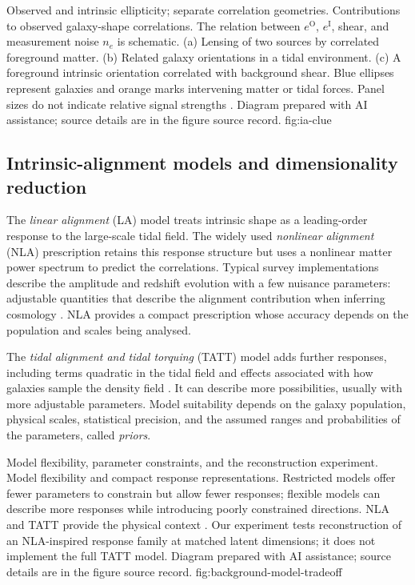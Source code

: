   {Observed and intrinsic ellipticity; separate correlation geometries.}
  {Contributions to observed galaxy-shape correlations. The relation between
   $e^{\mathrm{O}}$, $e^{\mathrm{I}}$, shear, and measurement noise $n_e$ is
   schematic. (a) Lensing of two sources by correlated foreground matter.
   (b) Related galaxy orientations in a tidal environment.
   (c) A foreground intrinsic orientation correlated with background shear.
   Blue ellipses represent galaxies and orange marks intervening matter or
   tidal forces. Panel sizes do not indicate
   relative signal strengths \citep{2025A&ARv..33....5C}.
   Diagram prepared with AI assistance; source details are in the figure source record.}
  {fig:ia-clue}

\subsection{Intrinsic-alignment models and dimensionality reduction}
\label{sec:ia-models-background}

The \emph{linear alignment} (LA) model treats intrinsic shape as a
leading-order response to the large-scale tidal field. The widely used
\emph{nonlinear alignment} (NLA) prescription retains this response
structure but uses a nonlinear matter power spectrum to predict the
correlations. Typical survey implementations describe the amplitude and
redshift evolution with a few nuisance parameters: adjustable quantities
that describe the alignment contribution when inferring cosmology
\citep{2007NJPh....9..444B}. NLA provides a compact prescription whose
accuracy depends on the population and scales being analysed.

The \emph{tidal alignment and tidal torquing} (TATT) model adds further
responses, including terms quadratic in the tidal field and effects
associated with how galaxies sample the density field
\citep{2019PhRvD.100j3506B}. It can describe more possibilities, usually
with more adjustable parameters. Model suitability depends on the galaxy
population, physical scales, statistical precision, and the assumed ranges
and probabilities of the parameters, called \emph{priors}.

  {Model flexibility, parameter constraints, and the reconstruction experiment.}
  {Model flexibility and compact response representations. Restricted
   models offer fewer parameters to constrain but allow fewer responses;
   flexible models can describe more responses while introducing poorly
   constrained directions. NLA and TATT provide the physical context
   \citep{2007NJPh....9..444B,2019PhRvD.100j3506B}. Our experiment tests
   reconstruction of an NLA-inspired response family at matched latent
   dimensions; it does not implement the full TATT model.
   Diagram prepared with AI assistance; source details are in the figure source record.}
  {fig:background-model-tradeoff}

